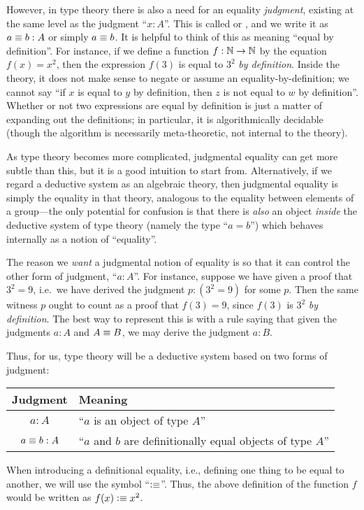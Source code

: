 However, in type theory there is also a need for an equality \emph{judgment}, existing at the same level as the judgment ``$x:A$''.
%
This is called 
%
%
or ,
%
%
and we write it as $a\equiv b : A$ or simply $a \equiv b$.
It is helpful to think of this as meaning ``equal by definition''.
For instance, if we define a function $f:\mathbb{N}\to\mathbb{N}$ by the equation $f(x)=x^2$, then the expression $f(3)$ is equal to $3^2$ \emph{by definition}.
Inside the theory, it does not make sense to negate or assume an equality-by-definition; we cannot say ``if $x$ is equal to $y$ by definition, then $z$ is not equal to $w$ by definition''.
Whether or not two expressions are equal by definition is just a matter of expanding out the definitions; in particular, it is algorithmically decidable (though the algorithm is necessarily meta-theoretic, not internal to the theory).

As type theory becomes more complicated, judgmental equality can get more subtle than this, but it is a good intuition to start from.
Alternatively, if we regard a deductive system as an algebraic theory, then judgmental equality is simply the equality in that theory, analogous to the equality between elements of a group---the only potential for confusion is that there is \emph{also} an object \emph{inside} the deductive system of type theory (namely the type ``$a=b$'') which behaves internally as a notion of ``equality''.

The reason we \emph{want} a judgmental notion of equality is so that it can control the other form of judgment, ``$a:A$''.
For instance, suppose we have given a proof that $3^2=9$, i.e.\ we have derived the judgment $p:(3^2=9)$ for some $p$.
Then the same witness $p$ ought to count as a proof that $f(3)=9$, since $f(3)$ is $3^2$ \emph{by definition}.
The best way to represent this is with a rule saying that given the judgments $a:A$ and $A\equiv B$, we may derive the judgment $a:B$.

Thus, for us, type theory will be a deductive system based on two forms of judgment:
\begin{center}
\medskip
\begin{tabular}{cl}
  \toprule
  Judgment & Meaning\\
  \midrule
  $a : A$       & ``$a$ is an object of type $A$''\\
  $a \equiv b : A$ & ``$a$ and $b$ are definitionally equal objects of type $A$''\\
  \bottomrule
\end{tabular}
\medskip
\end{center}
%
%
When introducing a definitional equality, i.e., defining one thing to be equal to another, we will use the symbol ``$\vcentcolon\equiv$''.
Thus, the above definition of the function $f$ would be written as $f(x)\vcentcolon\equiv x^2$.

